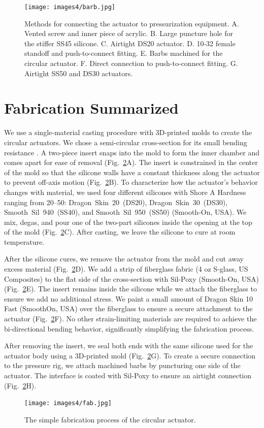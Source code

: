 \begin{figure}[ht!]
    \centering
    \texttt{[image: images4/barb.jpg]}
    \caption{Methods for connecting the actuator to pressurization equipment. A. Vented screw and inner piece of acrylic. B. Large puncture hole for the stiffer SS45 silicone. C. Airtight DS20 actuator. D. 10-32 female standoff and push-to-connect fitting. E. Barbs machined for the circular actuator. F. Direct connection to push-to-connect fitting. G. Airtight SS50 and DS30 actuators. }
    \label{fig:barb}
\end{figure}

\clearpage
\section{Fabrication Summarized}

We use a single-material casting procedure with 3D-printed molds to create the circular actuators. We chose a semi-circular cross-section for its small bending resistance \cite{polygerinos_modeling_2015}. A two-piece insert snaps into the mold to form the inner chamber and comes apart for ease of removal (Fig.~\ref{figure:fab}A). The insert is constrained in the center of the mold so that the silicone walls have a constant thickness along the actuator to prevent off-axis motion (Fig.~\ref{figure:fab}B). To characterize how the actuator's behavior changes with material, we used four different silicones with Shore A Hardness ranging from 20--50: Dragon~Skin~20~(DS20), Dragon~Skin~30~(DS30), Smooth~Sil~940~(SS40), and Smooth~Sil~950~(SS50) (Smooth-On, USA). We mix, degas, and pour one of the two-part silicones inside the opening at the top of the mold (Fig.~\ref{figure:fab}C). After casting, we leave the silicone to cure at room temperature. 

After the silicone cures, we remove the actuator from the mold and cut away excess material (Fig.~\ref{figure:fab}D). We add a strip of fiberglass fabric (4 oz S-glass, US Composites) to the flat side of the cross-section with Sil-Poxy (Smooth-On, USA) (Fig.~\ref{figure:fab}E). The insert remains inside the silicone while we attach the fiberglass to ensure we add no additional stress. We paint a small amount of Dragon Skin 10 Fast (SmoothOn, USA) over the fiberglass to ensure a secure attachment to the actuator (Fig.~\ref{figure:fab}F). No other strain-limiting materials are required to achieve the bi-directional bending behavior, significantly simplifying the fabrication process. 

After removing the insert, we seal both ends with the same silicone used for the actuator body using a 3D-printed mold (Fig.~\ref{figure:fab}G). To create a secure connection to the pressure rig, we attach machined barbs by puncturing one side of the actuator. The interface is coated with Sil-Poxy to ensure an airtight connection (Fig.~\ref{figure:fab}H).

\begin{figure}[ht!]
    \centering
     \texttt{[image: images4/fab.jpg]}
    \caption{The simple fabrication process of the circular actuator.}
    \label{figure:fab}
\end{figure}